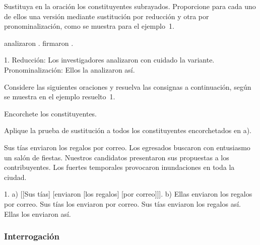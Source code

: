 \begin{ejercicio}\label{ej:05-sustitucion}
Sustituya en la oración los constituyentes subrayados. Proporcione para cada uno
de ellos una versión mediante sustitución por reducción y otra por
pronominalización, como se muestra para el ejemplo~1.

\begin{exe}
  \ex {} analizaron  .
  \ex {} firmaron  .
\end{exe}

\begin{resuelto}
1. Reducción: Los investigadores analizaron con cuidado la variante.
Pronominalización: Ellos la analizaron así.
\end{resuelto}
\end{ejercicio}

\begin{ejercicio}\label{ej:05-encorchetar}
Considere las siguientes oraciones y resuelva las consignas a continuación,
según se muestra en el ejemplo resuelto~1.

\begin{consignas}
  \item Encorchete los constituyentes.
  \item Aplique la prueba de sustitución a todos los constituyentes
        encorchetados en a).
\end{consignas}

\begin{exe}
  \ex Sus tías enviaron los regalos por correo.
  \ex Los egresados buscaron con entusiasmo un salón de fiestas.
  \ex Nuestros candidatos presentaron sus propuestas a los contribuyentes.
  \ex Los fuertes temporales provocaron inundaciones en toda la ciudad.
\end{exe}

\begin{resuelto}
1. a) [[Sus tías] [enviaron [los regalos] [por correo]]]. b) Ellas enviaron los
regalos por correo. Sus tías los enviaron por correo. Sus tías enviaron los
regalos así. Ellas los enviaron así.
\end{resuelto}
\end{ejercicio}

\subsubsection{Interrogación}\label{sec:05-interrogacion}

